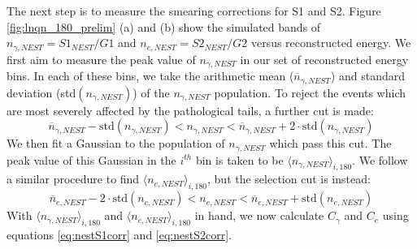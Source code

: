 The next step is to measure the smearing corrections for S1 and S2. Figure \ref{fig:lnqn_180_prelim} (a) and (b) show the simulated bands of $n_{\gamma,NEST}=S1_{NEST}/G1$ and $n_{e,NEST}=S2_{NEST}/G2$ versus reconstructed energy. We first aim to measure the peak value of $n_{\gamma,NEST}$ in our set of reconstructed energy bins. In each of these bins, we take the arithmetic mean ($\overline{n}_{\gamma,NEST}$) and standard deviation (std$(n_{\gamma,NEST})$) of the $n_{\gamma,NEST}$ population. To reject the events which are most severely affected by the pathological tails, a further cut is made:
\begin{equation}
\overline{n}_{\gamma,NEST}-\text{std}(n_{\gamma,NEST})<n_{\gamma,NEST}<\overline{n}_{\gamma,NEST}+2\cdot \text{std}(n_{\gamma,NEST})
\end{equation}
We then fit a Gaussian to the population of $n_{\gamma,NEST}$ which pass this cut. The peak value of this Gaussian in the $i^{th}$ bin is taken to be $\langle n_{\gamma,NEST} \rangle_{i,180}$. We follow a similar procedure to find $\langle n_{e,NEST} \rangle_{i,180}$, but the selection cut is instead:
\begin{equation}
\overline{n}_{e,NEST}-2\cdot \text{std}(n_{e,NEST})<n_{e,NEST}<\overline{n}_{e,NEST}+ \text{std}(n_{e,NEST})
\end{equation}
With $\langle n_{\gamma,NEST} \rangle_{i,180}$ and $\langle n_{e,NEST} \rangle_{i,180}$ in hand, we now calculate $C_{\gamma}$ and $C_e$ using equations \ref{eq:nestS1corr} and \ref{eq:nestS2corr}.
